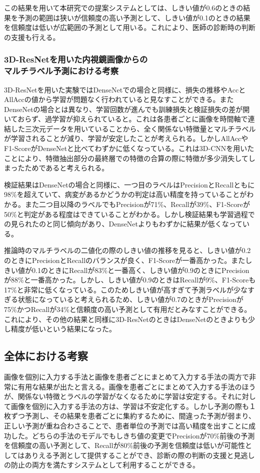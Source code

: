 この結果を用いて本研究での提案システムとしては、しきい値が0.6のときの結果を予測の範囲は狭いが信頼度の高い予測として、しきい値が0.1のときの結果を信頼度は低いが広範囲の予測として用いる。これにより、医師の診断時の判断の支援も行える。

\subsubsection{3D-ResNetを用いた内視鏡画像からの\\マルチラベル予測における考察}
3D-ResNetを用いた実験ではDenseNetでの場合と同様に、損失の推移やAccとAllAccの値から学習が問題なく行われていると見なすことができる。またDenseNetの場合とは異なり、学習回数が進んでも訓練損失と検証損失の差が開いておらず、過学習が抑えられていると。これは各患者ごとに画像を時間軸で連結した三次元データを用いていることから、全く関係ない特徴量とマルチラベルが学習されることが減り、学習が安定したことが考えられる。しかしAllAccやF1-ScoreがDenseNetと比べてわずかに低くなっている。これは3D-CNNを用いたことにより、特徴抽出部分の最終層での特徴の合算の際に特徴が多少消失してしまったためであると考えられる。

検証結果はDenseNetの場合と同様に、一つ目のラベルはPrecisionとRecallともに98\%を超えていて、病変があるかどうかの判定は高い精度を持っていることがわかる。また二つ目以降のラベルでもPrecisionが71\%、Recallが39\%、F1-Scoreが50\%と判定がある程度はできていることがわかる。しかし検証結果も学習過程での見られたのと同じ傾向があり、DenseNetよりもわずかに結果が低くなっている。

推論時のマルチラベルの二値化の際のしきい値の推移を見ると、しきい値が0.2のときにPrecisionとRecallのバランスが良く、F1-Scoreが一番高かった。またしきい値が0.1のときにRecallが83\%と一番高く、しきい値が0.9のときにPrecisionが88\%と一番高かった。しかし、しきい値が0.9のときはRecallが9\%、F1-Scoreも17\%と非常に低くなっている。このためしきい値が高すぎて予測ラベルが少なすぎる状態になっていると考えられるため、しきい値が0.7のときがPrecisionが75\%かつRecallが34\%と信頼度の高い予測として有用だとみなすことができる。これにより、その他の結果と同様に3D-ResNetのときはDenseNetのときよりも少し精度が低いという結果になった。

\subsection{全体における考察}
画像を個別に入力する手法と画像を患者ごとにまとめて入力する手法の両方で非常に有用な結果が出たと言える。画像を患者ごとにまとめて入力する手法のほうが、関係ない特徴とラベルの学習がなくなるために学習は安定する。それに対して画像を個別に入力する手法の方は、学習は不安定化する。しかし予測の際も１枚ずつ予測し、その結果を患者ごとに集約するために、間違った予測が弱まり、正しい予測が重ね合わさることで、患者単位の予測では高い精度を出すことに成功した。どちらの手法のモデルでもしきち値の変更でPrecisionが70\%前後の予測を信頼度の高い予測として、Recallが80\%前後の予測を信頼度は低いが可能性としてはありえる予測として提供することができ、診断の際の判断の支援と見逃しの防止の両方を満たすシステムとして利用することができる。
